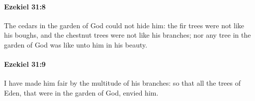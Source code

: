 		\paragraph{Ezekiel 31:8} %
			\label{EZEKIEL-31-8}

			The cedars in the garden of God could not hide him: the fir trees were not like his boughs, and the chestnut trees were not like his branches; nor any tree in the garden of God was like unto him in his beauty.


		\paragraph{Ezekiel 31:9} %
			\label{EZEKIEL-31-9}

			I have made him fair by the multitude of his branches: so that all the trees of Eden, that were in the garden of God, envied him.


